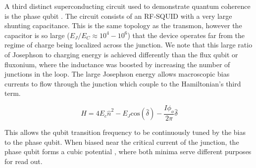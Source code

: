 \documentclass[%
 reprint,
showpacs,
 amsmath,amssymb,
 aps,
longbibliography,
]{revtex4-1}
\begin{document}
A third distinct superconducting circuit used to demonstrate quantum coherence is the phase qubit \cite{PhaseQubit}. The circuit consists of an RF-SQUID with a very large shunting capacitance. This is the same topology as the transmon, however the capacitor is so large ($E_J / E_C \approx 10^4-10^6$)  that the device operates far from the regime of charge being localized across the junction. We note that this large ratio of Josephson to charging energy is achieved differently than the flux qubit or fluxonium, where the inductance was boosted by increasing the number of junctions in the loop. The large Josephson energy allows macroscopic bias currents to flow through the junction which couple to the Hamiltonian's third term.

\begin{equation*}
H = 4E_c \hat{n}^2 -E_J \textrm{cos}(\hat{\delta}) -\frac{I \phi_o}{2\pi}\hat{\delta}
\end{equation*}

This allows the qubit transition frequency to be continuously tuned by the bias to the phase qubit. When biased near the critical current of the junction, the phase qubit forms a cubic potential \cite{Clarke}, where both minima serve different purposes for read out.
\end{document}

